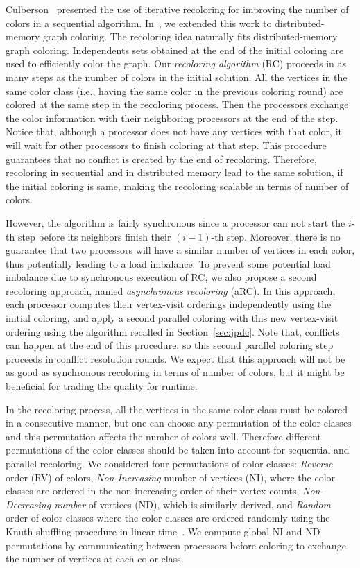 \documentclass{article}
\begin{document}
Culberson~\cite{Culberson92iteratedgreedy} presented the use of
iterative recoloring for improving the number of colors in a
sequential algorithm. In~\cite{HiPC11}, we extended this work to distributed-memory
graph coloring. The recoloring idea naturally fits distributed-memory
graph coloring.  Independents sets obtained at the end of the initial
coloring are used to efficiently color the graph. Our {\em recoloring algorithm} (RC)
proceeds in as many steps as the number of colors in the initial
solution. All the vertices in the same color class (i.e., having the
same color in the previous coloring round) are colored at the same
step in the recoloring process. Then the processors exchange the color
information with their neighboring processors at the end of the
step. Notice that, although a processor does not have any vertices with
that color, it will wait for other processors to finish coloring at that
step. This procedure guarantees that no conflict is created by the end of
recoloring. Therefore, recoloring in
sequential and in distributed memory lead to the same solution, if
the initial coloring is same, making
the recoloring scalable in terms of number of colors.

However, the algorithm is fairly synchronous since a processor can not
start the $i$-th step before its neighbors finish their $(i-1)$-th
step. Moreover, there is no guarantee that two processors will have a
similar number of vertices in each color, thus potentially leading to
a load imbalance. To prevent some potential load imbalance due to
synchronous execution of RC, we also propose a second recoloring
approach, named {\em asynchronous recoloring} (aRC). In this
approach, each processor computes their vertex-visit
orderings independently using the initial coloring, and apply a second parallel
coloring with this new vertex-visit ordering using the algorithm
recalled in Section~\ref{sec:jpdc}. Note that, conflicts can
happen at the end of this procedure, so this second parallel
coloring step proceeds in conflict resolution rounds. We expect
that this approach will not be as good as synchronous recoloring in
terms of number of colors, but it might be beneficial for trading the
quality for runtime.

In the recoloring process, all the vertices in the same
color class must be colored in a consecutive manner, but one can
choose any permutation of the color classes and this permutation affects
the number of colors well. Therefore different permutations
of the color classes should be taken into account for sequential and parallel
recoloring. We considered four permutations of color classes: {\em
  Reverse} order (RV) of colors, {\em Non-Increasing} number of
vertices (NI), where the color classes are ordered in the
non-increasing order of their vertex counts, {\em Non-Decreasing
  number} of vertices (ND), which is similarly derived, and {\em
  Random} order of color classes where the color classes are ordered
randomly using the Knuth shuffling procedure in linear
time~\cite{Culberson92iteratedgreedy}.  We compute global NI and
ND permutations by communicating between processors before coloring to
exchange the number of vertices at each color class.
\end{document}
